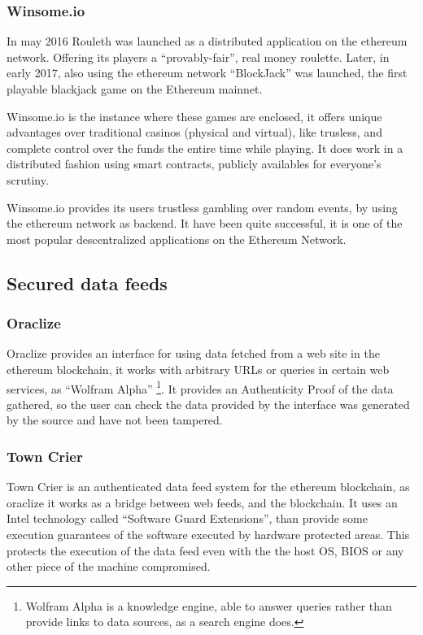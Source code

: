 \subsubsection{Winsome.io}
In may 2016 Rouleth\cite{winsomeio} was launched as a distributed application
  on the ethereum network. Offering its players a ``provably-fair'', real money
  roulette.
Later, in early 2017, also using the ethereum network ``BlockJack'' was
  launched, the first playable blackjack game on the Ethereum mainnet.

Winsome.io is the instance where these games are enclosed, it offers unique
  advantages over traditional casinos (physical and virtual), like trusless,
  and complete control over the funds the entire time while playing. It does
  work in a distributed fashion using smart contracts, publicly availables
  for everyone's scrutiny.

Winsome.io provides its users trustless gambling over random events, by using
  the ethereum network as backend. It have been quite successful, it is one
  of the most popular descentralized applications on the Ethereum Network.

\subsection{Secured data feeds}

\subsubsection{Oraclize}
Oraclize\cite{oraclizeit} provides an interface for using data fetched from a
  web site in the ethereum blockchain, it works with arbitrary URLs or queries
  in certain web services, as ``Wolfram Alpha'' \footnote{Wolfram Alpha is a
  knowledge engine, able to answer queries rather than provide links to data
  sources, as a search engine does.}.
It provides an Authenticity Proof of the data gathered, so the user can check
  the data provided by the interface was generated by the source and have not
  been tampered.

\subsubsection{Town Crier}
Town Crier\cite{zhang2016town} is an authenticated data feed system for
  the ethereum blockchain, as oraclize it works as a bridge between web feeds,
  and the blockchain. It uses an Intel technology called ``Software Guard
  Extensions''\cite{costan2016intel}, than provide some execution guarantees of
  the software executed by hardware protected areas. This protects the execution
  of the data feed even with the the host OS, BIOS or any other piece of the
  machine compromised.
